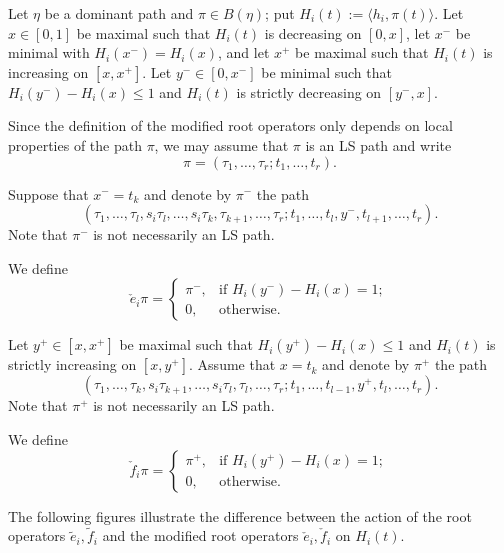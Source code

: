 \documentclass[final]{amsart}
\theoremstyle{plain}
\theoremstyle{definition}
\newcommand{\te}{\tilde e}
\newcommand{\tf}{\tilde f}
\newcommand{\cf}{\check{f}}
\newcommand{\ce}{\check{e}}
\begin{document}
Let $\eta$ be a dominant path and $\pi \in B(\eta)$; put $H_i(t) := \langle h_i, \pi(t)\rangle$.
Let $x \in [0, 1]$ be maximal such that $H_i(t)$ is decreasing on $[0, x]$, let $x^-$ be minimal with $H_i(x^-) = H_i(x)$, and let $x^+$ be maximal such that $H_i(t)$ is increasing on $[x, x^+]$.
Let $y^- \in [0, x^-]$ be minimal such that $H_i(y^-) - H_i(x) \le 1$ and $H_i(t)$ is strictly decreasing on $[y^-, x]$.

Since the definition of the modified root operators only depends on local properties of the path $\pi$, we may assume that $\pi$ is an LS path and write
\[
    \pi = (\tau_1, \dots, \tau_r; t_1, \dots, t_r).
\]

Suppose that $x^- = t_k$ and denote by $\pi^-$ the path
\[
    (\tau_1, \dots, \tau_l, s_i\tau_l, \dots, s_i\tau_k, \tau_{k+1}, \dots, \tau_r; t_1, \dots, t_l, y^-, t_{l+1}, \dots, t_r).
\]
Note that $\pi^-$ is not necessarily an LS path.

We define
\[
    \ce_i \pi = \begin{cases}
        \pi^-, & \text{if } H_i(y^-) - H_i(x) = 1; \\
        0, & \text{otherwise}.
    \end{cases}
\]

Let $y^+ \in [x, x^+]$ be maximal such that $H_i(y^+) - H_i(x) \le 1$ and $H_i(t)$ is strictly increasing on $[x, y^+]$.
Assume that $x = t_k$ and denote by $\pi^+$ the path
\[
    (\tau_1, \dots, \tau_k, s_i\tau_{k+1}, \dots, s_i\tau_l, \tau_l, \dots, \tau_r; t_1, \dots, t_{l-1}, y^+, t_l, \dots, t_r).
\]
Note that $\pi^+$ is not necessarily an LS path.

We define
\begin{equation}
    \label{equation:definition-cfi}
    \cf_i \pi = \begin{cases}
        \pi^+, & \text{if } H_i(y^+) - H_i(x) = 1; \\
        0, & \text{otherwise}.
    \end{cases}
\end{equation}

The following figures illustrate the difference between the action of the root operators $\te_i, \tf_i$ and the modified root operators $\ce_i, \cf_i$ on $H_i(t)$.
\end{document}
